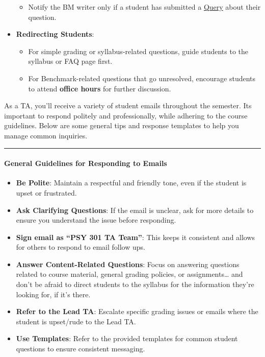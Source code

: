 \documentclass[
]{article}
\providecommand{\tightlist}{%
  \setlength{\itemsep}{0pt}\setlength{\parskip}{0pt}}
\begin{document}
\begin{itemize}
  \begin{itemize}
  \tightlist
  \item
    Notify the BM writer only if a student has submitted a \protect\hyperlink{benchmark-queries}{Query} about their question.
  \end{itemize}
\item
  \textbf{Redirecting Students}:

  \begin{itemize}
  \tightlist
  \item
    For simple grading or syllabus-related questions, guide students to the syllabus or FAQ page first.
  \item
    For Benchmark-related questions that go unresolved, encourage students to attend \textbf{office hours} for further discussion.
  \end{itemize}
\end{itemize}

As a TA, you'll receive a variety of student emails throughout the semester. Its important to respond politely and professionally, while adhering to the course guidelines. Below are some general tips and response templates to help you manage common inquiries.

\begin{center}\rule{0.5\linewidth}{0.5pt}\end{center}

\hypertarget{general-guidelines-for-responding-to-emails}{%
\paragraph{General Guidelines for Responding to Emails}\label{general-guidelines-for-responding-to-emails}}

\begin{itemize}
\tightlist
\item
  \textbf{Be Polite}: Maintain a respectful and friendly tone, even if the student is upset or frustrated.
\item
  \textbf{Ask Clarifying Questions}: If the email is unclear, ask for more details to ensure you understand the issue before responding.
\item
  \textbf{Sign email as ``PSY 301 TA Team''}: This keeps it consistent and allows for others to respond to email follow ups.
\item
  \textbf{Answer Content-Related Questions}: Focus on answering questions related to course material, general grading policies, or assignments\ldots{} and don't be afraid to direct students to the syllabus for the information they're looking for, if it's there.
\item
  \textbf{Refer to the Lead TA}: Escalate specific grading issues or emails where the student is upset/rude to the Lead TA.
\item
  \textbf{Use Templates}: Refer to the provided templates for common student questions to ensure consistent messaging.
\end{itemize}
\end{document}

